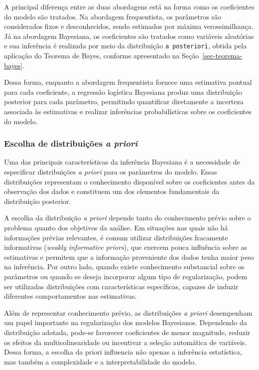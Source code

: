 \documentclass[
  brazilian,
  12pt,
  letterpaper,
  DIV=11,
  numbers=noendperiod]{scrartcl}
\begin{document}
A principal diferença entre as duas abordagens está na forma como os
coeficientes do modelo são tratados. Na abordagem frequentista, os
parâmetros são considerados fixos e desconhecidos, sendo estimados por
máxima verossimilhança. Já na abordagem Bayesiana, os coeficientes são
tratados como variáveis aleatórias e sua inferência é realizada por meio
da distribuição \texttt{a\ posteriori}, obtida pela aplicação do Teorema
de Bayes, conforme apresentado na Seção~\ref{sec-teorema-bayes}.

Dessa forma, enquanto a abordagem frequentista fornece uma estimativa
pontual para cada coeficiente, a regressão logística Bayesiana produz
uma distribuição posterior para cada parâmetro, permitindo quantificar
diretamente a incerteza associada às estimativas e realizar inferências
probabilísticas sobre os coeficientes do modelo.

\subsubsection{\texorpdfstring{Escolha de distribuições \emph{a
priori}}{Escolha de distribuições a priori}}\label{escolha-de-distribuiuxe7uxf5es-a-priori}

Uma das principais características da inferência Bayesiana é a
necessidade de especificar distribuições \emph{a priori} para os
parâmetros do modelo. Essas distribuições representam o conhecimento
disponível sobre os coeficientes antes da observação dos dados e
constituem um dos elementos fundamentais da distribuição posterior.

A escolha da distribuição \emph{a priori} depende tanto do conhecimento
prévio sobre o problema quanto dos objetivos da análise. Em situações
nas quais não há informações prévias relevantes, é comum utilizar
distribuições fracamente informativas (\emph{weakly informative
priors}), que exercem pouca influência sobre as estimativas e permitem
que a informação proveniente dos dados tenha maior peso na inferência.
Por outro lado, quando existe conhecimento substancial sobre os
parâmetros ou quando se deseja incorporar algum tipo de regularização,
podem ser utilizadas distribuições com características específicas,
capazes de induzir diferentes comportamentos nas estimativas.

Além de representar conhecimento prévio, as distribuições \emph{a
priori} desempenham um papel importante na regularização dos modelos
Bayesianos. Dependendo da distribuição adotada, pode-se favorecer
coeficientes de menor magnitude, reduzir os efeitos da
multicolinearidade ou incentivar a seleção automática de variáveis.
Dessa forma, a escolha da priori influencia não apenas a inferência
estatística, mas também a complexidade e a interpretabilidade do modelo.
\end{document}
